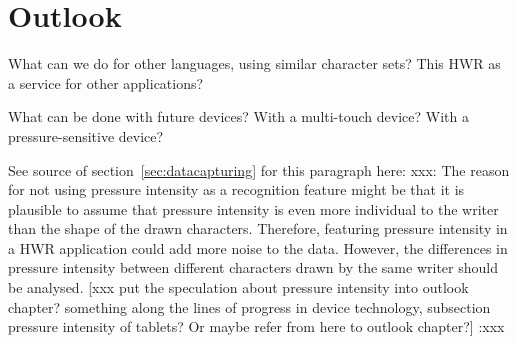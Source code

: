 
\chapter{Outlook}

What can we do for other languages, using similar character sets?
This HWR as a service for other applications?

What can be done with future devices?
With a multi-touch device?
With a pressure-sensitive device?

See source of section~\ref{sec:datacapturing} for this paragraph here:
xxx: 
The reason for not using pressure intensity as a recognition feature might be 
that it is plausible to assume that pressure intensity is even more individual 
to the writer than the shape of the drawn characters. 
Therefore, featuring pressure intensity in a HWR application could add more 
noise to the data. However, the differences in pressure intensity 
between different characters drawn by the same writer should be analysed.
[xxx put the speculation about pressure intensity into outlook chapter? 
something along the lines of progress in device technology, 
subsection pressure intensity of tablets? Or maybe refer from here to
outlook chapter?] 
:xxx

